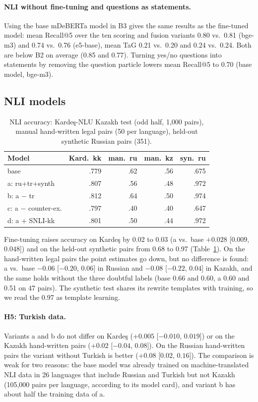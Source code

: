 \documentclass[11pt]{article}
\begin{document}
\paragraph{NLI without fine-tuning and questions as statements.} Using the base mDeBERTa model in B3 gives the
same results as the fine-tuned model: mean Recall@5 over the ten scoring and fusion variants 0.80 vs.\ 0.81
(bge-m3) and 0.74 vs.\ 0.76 (e5-base), mean TaG 0.21 vs.\ 0.20 and 0.24 vs.\ 0.24. Both are below B2 on average
(0.85 and 0.77). Turning yes/no questions into statements by removing the question particle lowers mean
Recall@5 to 0.70 (base model, bge-m3).

\subsection{NLI models}

\begin{table}[t]
\centering\small\setlength{\tabcolsep}{4pt}
\begin{tabular}{lrrrr}
\toprule
Model & Kard.\ kk & man.\ ru & man.\ kz & syn.\ ru \\
\midrule
base & .779 & .62 & .56 & .675 \\
a: ru+tr+synth & .807 & .56 & .48 & .972 \\
b: a $-$ tr & .812 & .64 & .50 & .974 \\
c: a $-$ counter-ex. & .797 & .40 & .40 & .647 \\
d: a + SNLI-kk & .801 & .50 & .44 & .972 \\
\bottomrule
\end{tabular}
\caption{NLI accuracy: Karde\c{s}-NLU Kazakh test (odd half, 1,000 pairs), manual hand-written legal pairs (50 per
language), held-out synthetic Russian pairs (351).}
\label{tab:nli}
\end{table}

Fine-tuning raises accuracy on Karde\c{s} by 0.02 to 0.03 (a vs.\ base $+0.028$ [$0.009$, $0.048$]) and on
the held-out synthetic pairs from 0.68 to 0.97 (Table~\ref{tab:nli}). On the hand-written legal pairs the point
estimates go down, but no difference is found: a vs.\ base $-0.06$ [$-0.20$, $0.06$] in Russian and $-0.08$
[$-0.22$, $0.04$] in Kazakh, and the same holds without the three doubtful labels (base 0.66 and 0.60, a 0.60
and 0.51 on 47 pairs). The synthetic test shares its rewrite templates with training, so we read the 0.97 as
template learning.

\paragraph{H5: Turkish data.} Variants a and b do not differ on Karde\c{s} ($+0.005$ [$-0.010$, $0.019$]) or
on the Kazakh hand-written pairs ($+0.02$ [$-0.04$, $0.08$]). On the Russian hand-written pairs the variant
without Turkish is better ($+0.08$ [$0.02$, $0.16$]). The comparison is weak for two reasons: the base
model was already trained on machine-translated NLI data in 26 languages that include Russian and Turkish but
not Kazakh (105,000 pairs per language, according to its model card), and variant b has about half the
training data of a.
\end{document}
